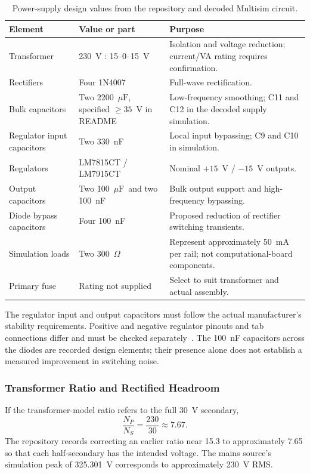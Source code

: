 \documentclass[11pt,a4paper]{article}
\newcommand{\ohm}{\ensuremath{\Omega}}
\newcommand{\uF}{\ensuremath{\mu\mathrm{F}}}
\begin{document}
\begin{table}[htbp]
\centering\small
\caption{Power-supply design values from the repository and decoded Multisim circuit.}
\begin{tabularx}{\textwidth}{P{0.31\textwidth}P{0.25\textwidth}Y}
\toprule
\textbf{Element} & \textbf{Value or part} & \textbf{Purpose}\\
\midrule
Transformer & 230~V : 15--0--15~V & Isolation and voltage reduction; current/VA rating requires confirmation.\\
Rectifiers & Four 1N4007 & Full-wave rectification.\\
Bulk capacitors & Two 2200~\uF, specified $\geq35$~V in README & Low-frequency smoothing; C11 and C12 in the decoded supply simulation.\\
Regulator input capacitors & Two 330~nF & Local input bypassing; C9 and C10 in simulation.\\
Regulators & LM7815CT / LM7915CT & Nominal $+15$~V / $-15$~V outputs.\\
Output capacitors & Two 100~\uF\ and two 100~nF & Bulk output support and high-frequency bypassing.\\
Diode bypass capacitors & Four 100~nF & Proposed reduction of rectifier switching transients.\\
Simulation loads & Two 300~\ohm & Represent approximately 50~mA per rail; not computational-board components.\\
Primary fuse & Rating not supplied & Select to suit transformer and actual assembly.\\
\bottomrule
\end{tabularx}
\end{table}

The regulator input and output capacitors must follow the actual manufacturer's stability requirements. Positive and negative regulator pinouts and tab connections differ and must be checked separately~\cite{lm7815,lm7915}. The 100~nF capacitors across the diodes are recorded design elements; their presence alone does not establish a measured improvement in switching noise.

\subsubsection{Transformer Ratio and Rectified Headroom}
If the transformer-model ratio refers to the full 30~V secondary,
\begin{equation}
\frac{N_P}{N_S}=\frac{230}{30}\approx7.67.
\end{equation}
The repository records correcting an earlier ratio near 15.3 to approximately 7.65 so that each half-secondary has the intended voltage. The mains source's simulation peak of 325.301~V corresponds to approximately 230~V RMS.
\end{document}
